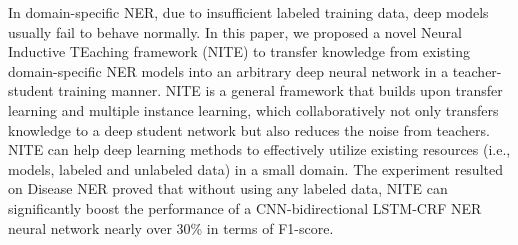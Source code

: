 In domain-specific NER, due to insufficient labeled training data, deep models usually fail to behave normally. In this paper, we proposed a novel Neural Inductive TEaching framework (NITE) to transfer knowledge from existing domain-specific NER models into an arbitrary deep neural network in a teacher-student training manner. NITE is a general framework that builds upon transfer learning and multiple instance learning, which collaboratively not only transfers knowledge to a deep student network but also reduces the noise from teachers. NITE can help deep learning methods to effectively utilize existing resources (i.e., models, labeled and unlabeled data) in a small domain. The experiment resulted on Disease NER proved that without using any labeled data, NITE can significantly boost the performance of a CNN-bidirectional LSTM-CRF NER neural network nearly over 30\% in terms of F1-score.
